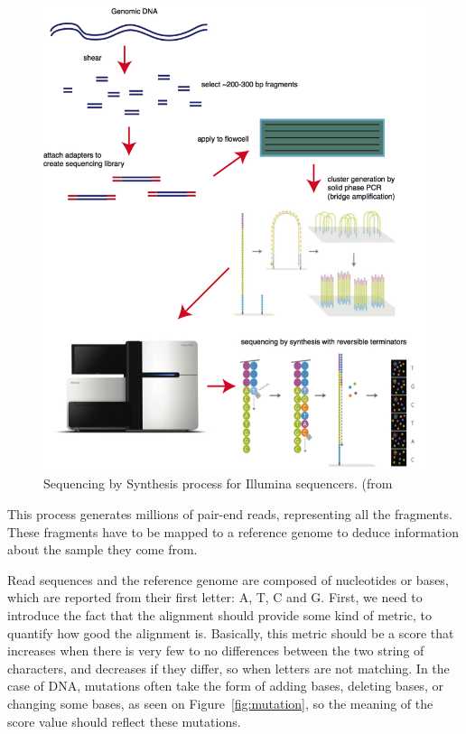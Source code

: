 \begin{figure}
    \centering
    \includegraphics{sbs}
    \caption{Sequencing by Synthesis process for Illumina sequencers. (from~\cite{bitesizebio:sbs}}
    \label{fig:sbs}
\end{figure}{}

This process generates millions of pair-end reads, representing all the fragments. These fragments have to be mapped to a reference genome to deduce information about the sample they come from.

Read sequences and the reference genome are composed of nucleotides or bases, which are reported from their first letter: A, T, C and G. First, we need to introduce the fact that the alignment should provide some kind of metric, to quantify how good the alignment is. Basically, this metric should be a score that increases when there is very few to no differences between the two string of characters, and decreases if they differ, so when letters are not matching. In the case of DNA, mutations often take the form of adding bases, deleting bases, or changing some bases, as seen on Figure~\ref{fig:mutation}, so the meaning of the score value should reflect these mutations.

